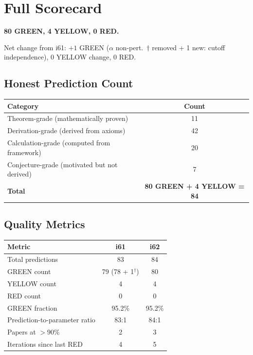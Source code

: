 \documentclass[11pt,a4paper]{article}
\begin{document}
\section{Full Scorecard}

\textbf{80 GREEN, 4 YELLOW, 0 RED.}

Net change from i61: $+1$ GREEN ($\alpha$ non-pert.\ $\dagger$ removed + 1 new: cutoff independence), 0 YELLOW change, 0 RED.

\subsection{Honest Prediction Count}

\begin{center}
\begin{tabular}{lc}
\toprule
\textbf{Category} & \textbf{Count} \\
\midrule
Theorem-grade (mathematically proven) & 11 \\
Derivation-grade (derived from axioms) & 42 \\
Calculation-grade (computed from framework) & 20 \\
Conjecture-grade (motivated but not derived) & 7 \\
\midrule
\textbf{Total} & \textbf{80 GREEN + 4 YELLOW = 84} \\
\bottomrule
\end{tabular}
\end{center}

\subsection{Quality Metrics}

\begin{center}
\begin{tabular}{lcc}
\toprule
\textbf{Metric} & \textbf{i61} & \textbf{i62} \\
\midrule
Total predictions & 83 & 84 \\
GREEN count & 79 (78 + 1$^\dagger$) & 80 \\
YELLOW count & 4 & 4 \\
RED count & 0 & 0 \\
GREEN fraction & 95.2\% & 95.2\% \\
Prediction-to-parameter ratio & 83:1 & 84:1 \\
Papers at $> 90\%$ & 2 & 3 \\
Iterations since last RED & 4 & 5 \\
\bottomrule
\end{tabular}
\end{center}
\end{document}
